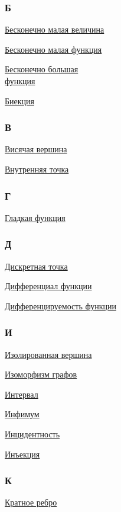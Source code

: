 \begin{multicols}{3}
\subsubsection*{Б}
\hyperlink{def:infinitesimal}{Бесконечно малая величина}

\hyperlink{def:infinitely_small_function}{Бесконечно малая функция}

\hyperlink{def:infinitely_large_function}{Бесконечно большая\\функция}

\hyperlink{def:bijection}{Биекция}

\subsubsection*{В}
\hyperlink{def:leaf_vertex}{Висячая вершина}

\hyperlink{def:interior_point}{Внутренняя точка}

\subsubsection*{Г}
\hyperlink{def:smoothness_of_function}{Гладкая функция}

\subsubsection*{Д}
\hyperlink{def:discrete_point}{Дискретная точка}

\hyperlink{def:differential_of_function}{Дифференциал функции}

\hyperlink{def:differentiability_of_function}{Дифференцируемость функции}

\subsubsection*{И}
\hyperlink{def:isolated_vertex}{Изолированная вершина}

\hyperlink{def:graph_isomorphism}{Изоморфизм графов}

\hyperlink{def:open_interval}{Интервал}

\hyperlink{def:infimum}{Инфимум}

\hyperlink{def:incidence}{Инцидентность}

\hyperlink{def:injection}{Инъекция}

\subsubsection*{К}
\hyperlink{def:multiple_edge}{Кратное ребро}


\end{multicols}
